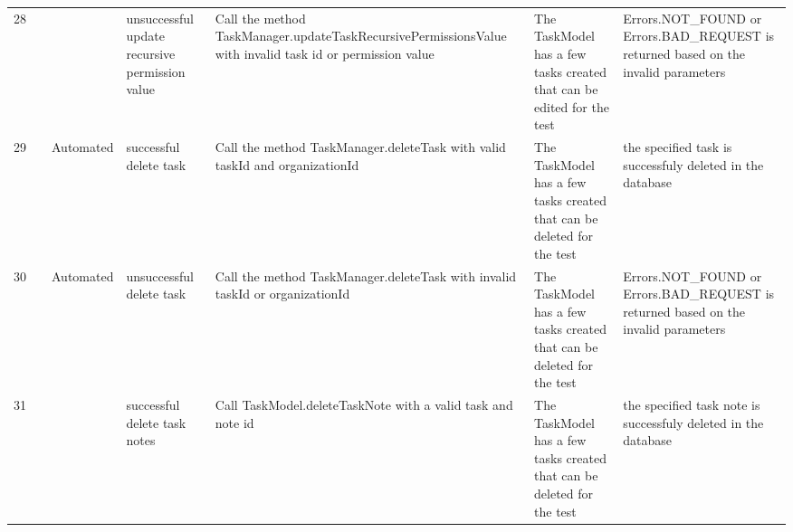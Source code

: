 \documentclass{article}
\begin{document}
{\begin{tabular}{|l|c|l|l|l|l|l|}
    \cellcolor[HTML]{FFFFFF}28                                    & \cellcolor[HTML]{FFFFFF}                                                     & \cellcolor[HTML]{FFFFFF}{\color[HTML]{11734B} Automated}        & unsuccessful update recursive permission value & \cellcolor[HTML]{FFFFFF}Call the method TaskManager.updateTaskRecursivePermissionsValue with invalid task id or permission value & \cellcolor[HTML]{FFFFFF}The TaskModel has a few tasks created that can be edited for the test  & \cellcolor[HTML]{FFFFFF}Errors.NOT\_FOUND or Errors.BAD\_REQUEST is returned based on the invalid parameters                  \\ \cline{1-1} \cline{3-7}
    \rowcolor[HTML]{FFFFFF}
    29                                                            & \cellcolor[HTML]{FFFFFF}                                                     & {\color[HTML]{11734B} Automated}                                & successful delete task                         & Call the method TaskManager.deleteTask with valid taskId and organizationId                                                      & The TaskModel has a few tasks created that can be deleted for the test                         & the specified task is successfuly deleted in the database                                                                     \\ \cline{1-1} \cline{3-7}
    \rowcolor[HTML]{FFFFFF}
    30                                                            & \cellcolor[HTML]{FFFFFF}                                                     & {\color[HTML]{11734B} Automated}                                & unsuccessful delete task                       & Call the method TaskManager.deleteTask with invalid taskId or organizationId                                                     & The TaskModel has a few tasks created that can be deleted for the test                         & Errors.NOT\_FOUND or Errors.BAD\_REQUEST is returned based on the invalid parameters                                          \\ \cline{1-1} \cline{3-7}
    \cellcolor[HTML]{FFFFFF}31                                    & \cellcolor[HTML]{FFFFFF}                                                     & \cellcolor[HTML]{FFFFFF}{\color[HTML]{11734B} Automated}        & successful delete task notes                   & Call TaskModel.deleteTaskNote with a valid task and note id                                                                      & \cellcolor[HTML]{FFFFFF}The TaskModel has a few tasks created that can be deleted for the test & \cellcolor[HTML]{FFFFFF}the specified task note is successfuly deleted in the database                                        \\ \cline{1-1} \cline{3-7}

\end{tabular}}
\end{document}
